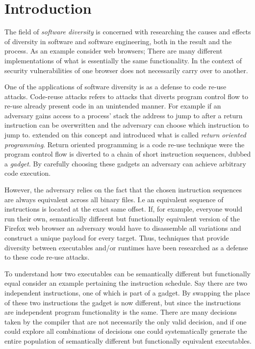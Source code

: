 \chapter{Introduction}

The field of \textit{software diversity} is concerned with researching the
causes and effects of diversity in software and software engineering, both in the result
and the process. As an example consider web browsers; There are many different implementations
of what is essentially the same functionality. In the context of security vulnerabilities
of one browser does not necessarily carry over to another\cite{survey}.

One of the applications of software diversity is as a defense to code re-use attacks\cite{survey}.
Code-reuse attacks refers to attacks that diverts program control flow to re-use already
present code in an unintended manner\cite{code-re-use}. For example if an adversary gains
access to a process' stack the address to jump to after a return instruction can be
overwritten and the adversary can choose which instruction to jump to. \textcite{rop}
extended on this concept and introduced what is called \textit{return oriented programming}.
Return oriented programming is a code re-use technique were the program control flow is
diverted to a chain of short instruction sequences, dubbed a \textit{gadget}. By carefully
choosing these gadgets an adversary can achieve arbitrary code execution.

However, the adversary relies on the fact that the chosen instruction sequences are always
equivalent across all binary files. I.e an equivalent sequence of instructions is located
at the exact same offset. If, for example, everyone would run their own, semantically
different but functionally equivalent version of the Firefox web browser an adversary would
have to disassemble all variations and construct a unique payload for every target. Thus,
techniques that provide diversity between executables and/or runtimes have been researched
as a defense to these code re-use attacks\cite{survey}.

To understand how two executables can be semantically different but functionally equal
consider an example pertaining the instruction schedule. Say there are two independent
instructions, one of which is part of a gadget. By swapping the place of these two
instructions the gadget is now different, but since the instructions are independent
program functionality is the same. There are many decisions taken by the compiler that are
not necessarily the only valid decision, and if one could explore all combinations of
decisions one could systematically generate the entire population of semantically different
but functionally equivalent executables.

